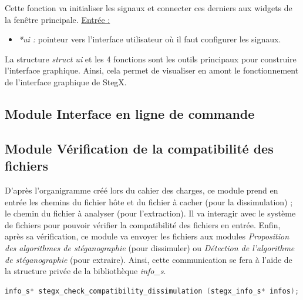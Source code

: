 \documentclass[11pt]{article}
\begin{document}
Cette fonction va initialiser les signaux et connecter ces derniers aux 
widgets de la fenêtre principale. 
\newline
\underline{Entrée :} 
\begin{itemize}
\item \textit{*ui :} pointeur vers l'interface utilisateur où il faut 
configurer les signaux. 
\newline 
\end{itemize}

La structure \textit{struct ui} et les 4 fonctions sont les outils principaux 
pour construire l'interface graphique. Ainsi, cela permet de visualiser 
en amont le fonctionnement de l'interface graphique de StegX. 

\subsection{Module Interface en ligne de commande}

\subsection{Module Vérification de la compatibilité des fichiers}

D'après l'organigramme créé lors du cahier des charges, ce module prend en 
entrée les chemins du fichier hôte et du fichier à cacher (pour la dissimulation) ; 
le chemin du fichier à analyser (pour l'extraction). Il va interagir avec 
le système de fichiers pour pouvoir vérifier la compatibilité des fichiers en entrée. 
Enfin, après sa vérification, ce module va envoyer les fichiers aux modules 
\textit{Proposition des algorithmes de stéganographie} (pour dissimuler) ou 
\textit{Détection de l'algorithme de stéganographie} (pour extraire). 
Ainsi, cette communication se fera à l'aide de la structure privée de la 
bibliothèque \textit{info\_s}. 
\newline

\begin{lstlisting}[language=c]
info_s* stegx_check_compatibility_dissimulation (stegx_info_s* infos);
\end{lstlisting}
\end{document}
